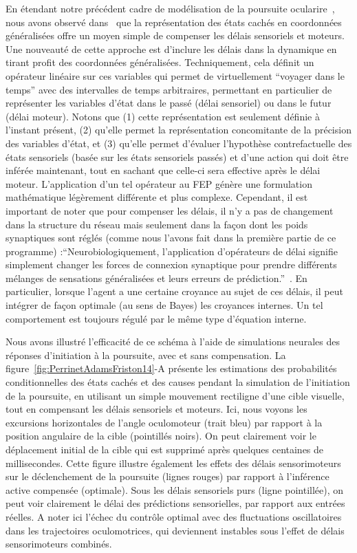 En étendant notre précédent cadre de modélisation de la poursuite ocularire~\citep{Adams12},
nous avons observé dans~\citep{PerrinetAdamsFriston14}
que la représentation des états cachés en coordonnées généralisées offre
un moyen simple de compenser les délais sensoriels et moteurs. Une nouveauté de cette
approche est d'inclure les délais dans la dynamique en tirant profit
des coordonnées généralisées. Techniquement, cela définit un opérateur
linéaire sur ces variables qui permet de virtuellement ``voyager dans le temps''
 avec des intervalles
de temps arbitraires, permettant en particulier de représenter les
variables d'état dans le passé (délai sensoriel) ou dans le futur
(délai moteur). Notons que (1) cette représentation est seulement définie à
l'instant présent, (2) qu'elle permet la représentation concomitante de
la précision des variables d'état, et (3) qu'elle permet d'évaluer
l'hypothèse contrefactuelle des états sensoriels (basée sur les états
sensoriels passés) et d'une action qui doit être inférée maintenant,
tout en sachant que celle-ci sera effective après le délai moteur.
L'application d'un tel opérateur au FEP génère une formulation
mathématique légèrement différente et plus complexe. Cependant, il est
important de noter que pour compenser les délais, il n'y a pas de
changement dans la structure du réseau mais seulement dans la façon dont
les poids synaptiques sont réglés (comme nous l'avons fait dans la
première partie de ce programme) :``Neurobiologiquement, l'application
d'opérateurs de délai signifie simplement changer les forces de
connexion synaptique pour prendre différents mélanges de sensations
généralisées et leurs erreurs de prédiction.''~\citep[section 3.1, ma traduction]{PerrinetAdamsFriston14}. En particulier, lorsque l'agent a une
certaine croyance au sujet de ces délais, il peut intégrer de façon
optimale (au sens de Bayes) les croyances internes. Un tel comportement est
toujours régulé par le même type d'équation interne.

Nous avons illustré l'efficacité de ce schéma à l'aide de simulations
neurales des réponses d'initiation à la poursuite, avec et sans
compensation. La figure~\ref{fig:PerrinetAdamsFriston14}-A présente les estimations des probabilités conditionnelles
des états cachés et des causes pendant la simulation de l'initiation de
la poursuite, en utilisant un simple mouvement rectiligne d'une cible visuelle, tout
en compensant les délais sensoriels et moteurs. Ici, nous voyons les
excursions horizontales de l'angle oculomoteur (trait bleu) par rapport à la
position angulaire de la cible (pointillés noirs). %
On peut clairement voir
le déplacement initial de la cible qui est supprimé après
quelques centaines de millisecondes. Cette figure illustre également les
effets des délais sensorimoteurs sur le déclenchement de la poursuite
(lignes rouges) par rapport à l'inférence active compensée (optimale).
Sous les délais sensoriels purs (ligne pointillée), on peut voir
clairement le délai des prédictions sensorielles, par rapport aux
entrées réelles. A noter ici l'échec du contrôle optimal avec des
fluctuations oscillatoires dans les trajectoires oculomotrices, qui
deviennent instables sous l'effet de délais sensorimoteurs combinés.

